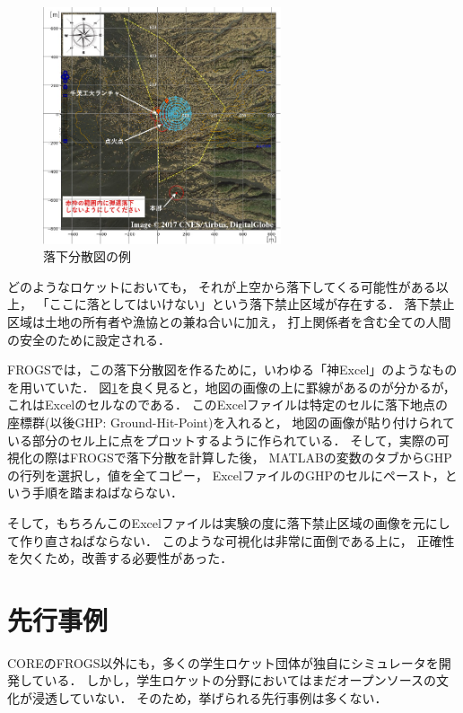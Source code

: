 \documentclass[a4j,10pt]{jsarticle}
\begin{document}
\begin{figure}[htbp]
	\begin{center}
		\includegraphics[width=7cm]{./ghp-example.png}
		\caption{落下分散図の例}
		\label{ghp-example}
	\end{center}
\end{figure}

どのようなロケットにおいても，
それが上空から落下してくる可能性がある以上，
「ここに落としてはいけない」という落下禁止区域が存在する．
落下禁止区域は土地の所有者や漁協との兼ね合いに加え，
打上関係者を含む全ての人間の安全のために設定される．

FROGSでは，この落下分散図を作るために，いわゆる「神Excel」のようなものを用いていた．
図\ref{ghp-example}を良く見ると，地図の画像の上に罫線があるのが分かるが，
これはExcelのセルなのである．
このExcelファイルは特定のセルに落下地点の座標群(以後GHP: Ground-Hit-Point)を入れると，
地図の画像が貼り付けられている部分のセル上に点をプロットするように作られている．
そして，実際の可視化の際はFROGSで落下分散を計算した後，
MATLABの変数のタブからGHPの行列を選択し，値を全てコピー，
ExcelファイルのGHPのセルにペースト，という手順を踏まねばならない．

そして，もちろんこのExcelファイルは実験の度に落下禁止区域の画像を元にして作り直さねばならない．
このような可視化は非常に面倒である上に，
正確性を欠くため，改善する必要性があった．

\section{先行事例}

COREのFROGS以外にも，多くの学生ロケット団体が独自にシミュレータを開発している．
しかし，学生ロケットの分野においてはまだオープンソースの文化が浸透していない．
そのため，挙げられる先行事例は多くない．
\end{document}
